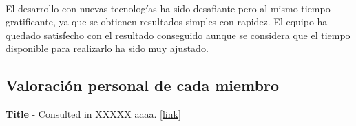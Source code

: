 \documentclass[a4paper]{article}
\begin{document}
		\paragraph{} El desarrollo con nuevas tecnologías ha sido desafiante pero al mismo tiempo gratificante, ya que se obtienen resultados simples con rapidez. El equipo ha quedado satisfecho con el resultado conseguido aunque se considera que el tiempo disponible para realizarlo ha sido muy ajustado.
		
	\subsection{Valoración personal de cada miembro}
	
\newpage
\begin{thebibliography}{99} 
 \textbf{Title} - Consulted in XXXXX aaaa. [\url{link}]

\end{thebibliography}
\end{document}
